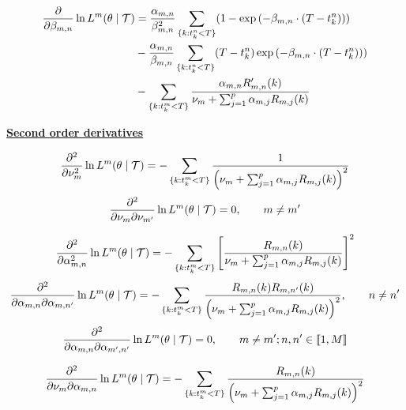 \begin{align}
\frac{\partial  } {\partial \beta_{m,n}} \ln L^m ( \theta \mid \mathcal{T} ) &= \frac {\alpha_{m,n}} {\beta_{m,n}^2} \sum_{ \{k : t_k^n < T \} } ( 1 - \exp \left ( - \beta_{m,n} \cdot ( T - t_k^n ) \right ) ) \notag \\ 
&-  \frac{ \alpha_{m,n} } { \beta_{m,n} } \sum_{ \{k : t_k^n < T \} } ( T-t_k^n) \exp \left ( - \beta_{m,n} \cdot ( T - t_k^n ) \right ) ) \notag \\ 
&- \sum_{ \{k : t_k^m < T \} } \frac{\alpha_{m,n} R'_{m,n} (k) }{ \nu_m + \sum_{j=1}^p \alpha_{m,j} R_{m,j} (k)}
\end{align}















\vspace{0.6 cm}
\underline{\textbf{Second order derivatives}}

\begin{equation}
\frac{\partial^2  } {\partial \nu_m^2} \ln L^m ( \theta \mid \mathcal{T} ) = -  \sum_{ \{k : t_k^m < T \} } \frac 1 { \left (\nu_m + \sum_{j=1}^p \alpha_{m,j} R_{m,j} (k) \right )^2}
\end{equation}
\begin{equation}
\frac{\partial^2 } {\partial \nu_m \partial \nu_{m'}} \ln L^m ( \theta \mid \mathcal{T} ) = 0, \qquad m \neq m'
\end{equation}


\begin{equation}
\frac{\partial^2  } {\partial \alpha_{m,n}^2} \ln L^m ( \theta \mid \mathcal{T} ) = - \sum_{ \{k : t_k^m < T \} } \left [ \frac{R_{m,n}(k)}{\nu_m + \sum_{j=1}^p \alpha_{m,j} R_{m,j} (k)} \right ] ^2
\end{equation}
\begin{equation}
\frac{\partial^2 } {\partial \alpha_{m,n} \partial \alpha_{m,n'} } \ln L^m ( \theta \mid \mathcal{T} ) =  - \sum_{ \{k : t_k^m < T \} }  \frac{R_{m,n}(k) R_{m,n'}(k) }
{\left ( \nu_m + \sum_{j=1}^p \alpha_{m,j} R_{m,j} (k)  \right ) ^2}, \qquad n \neq n'
\end{equation}
\begin{equation}
\frac{\partial^2 } {\partial \alpha_{m,n} \partial \alpha_{m',n'} } \ln L^m ( \theta \mid \mathcal{T} ) = 0 , \qquad m \neq m'; n,n' \in  \llbracket 1, M \rrbracket
\end{equation}

\begin{equation}
\frac{\partial^2 } {\partial \nu_m \partial \alpha_{m,n} } \ln L^m ( \theta \mid \mathcal{T} ) =  - \sum_{ \{k : t_k^m < T \} }  \frac{R_{m,n}(k) }{  \left ( \nu_m + \sum_{j=1}^p \alpha_{m,j} R_{m,j} (k) \right )^2} 
\end{equation}

